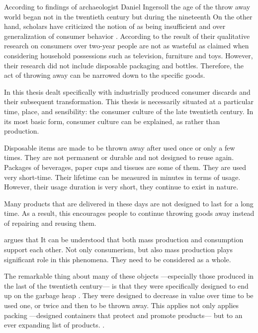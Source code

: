 According to findings of archaeologist Daniel Ingersoll the age of the throw away world began not in the twentieth century but during the nineteenth \citep[41]{rathje1992rubbish} On the other hand, scholars have criticized the notion of  as being insufficient and over generalization of consumer behavior \citep{gregson2007identity}. According to the result of their qualitative research on consumers over two-year people are not as wasteful as claimed when considering household possessions such as television, furniture and toys. However, their research did not include disposable packaging and bottles. Therefore, the act of throwing away can be narrowed down to the specific goods.

In this thesis dealt specifically with industrially produced consumer discards and their subsequent transformation. This thesis is necessarily situated at a particular time, place, and sensibility: the consumer culture of the late twentieth century. In its most basic form, consumer culture can be explained, as  \citep[2]{mamiya1992pop} rather than production.

Disposable items are made to be thrown away after used once or only a few times. They are not permanent or durable and not designed to reuse again. Packages of beverages, paper cups and tissues are some of them. They are used very short-time. Their lifetime can be measured in minutes in terms of usage. However, their usage duration is very short, they continue to exist in nature.

Many products that are delivered in these days are not designed to last for a long time. As a result, this encourages people to continue throwing goods away instead of repairing and reusing them.

\cite[9]{hawkins2001plastic} argues that  It can be understood that both mass production and consumption support each other. Not only consumerism, but also mass production plays significant role in this phenomena. They need to be considered as a whole.

The remarkable thing about many of these objects ---especially those produced in the last of the twentieth century--- is that they were specifically designed to end up on the garbage heap \citep{cerny1996recycled}. They were designed to decrease in value over time to be used one, or twice and then to be thrown away. This applies not only applies packing ---designed containers that protect and promote products--- but to an ever expanding list of products.  \citep{cerny1996recycled}.

